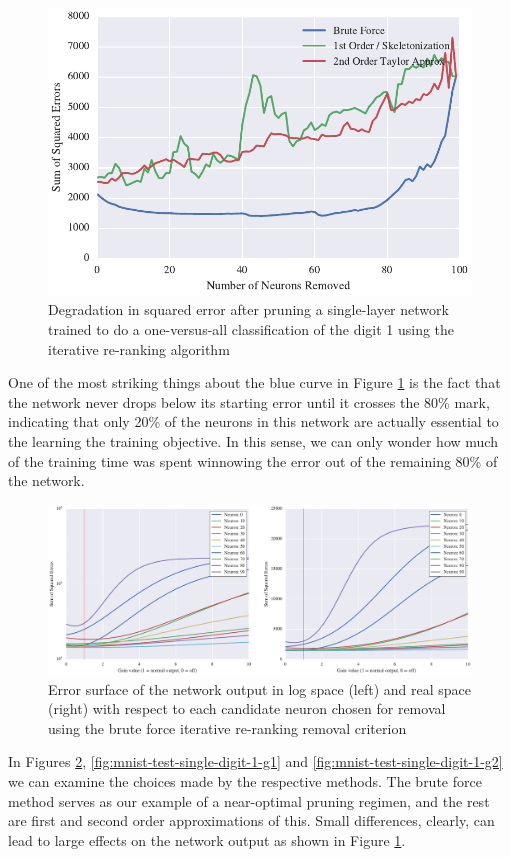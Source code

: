 \begin{figure}[!ht]
\centering
\includegraphics[width=0.5\linewidth]{mnist-test-single-digit-1.pdf}
\caption{Degradation in squared error after pruning a single-layer network trained to do a one-versus-all classification of the digit 1 using the iterative re-ranking algorithm}
\label{fig:mnist-test-single-digit-1}
\end{figure}

One of the most striking things about the blue curve in Figure \ref{fig:mnist-test-single-digit-1} is the fact that the network never drops below its starting error until it crosses the 80\% mark, indicating that only 20\% of the neurons in this network are actually essential to the learning the training objective. In this sense, we can only wonder how much of the training time was spent winnowing the error out of the remaining 80\% of the network. 

\begin{figure}[!ht]
\centering
\includegraphics[width=\linewidth]{mnist-test-single-digit-1-gt.pdf}
\caption{Error surface of the network output in log space (left) and real space (right) with respect to each candidate neuron chosen for removal using the brute force iterative re-ranking removal criterion}
\label{fig:mnist-test-single-digit-1-gt}
\end{figure}

In Figures \ref{fig:mnist-test-single-digit-1-gt}, \ref{fig:mnist-test-single-digit-1-g1} and \ref{fig:mnist-test-single-digit-1-g2} we can examine the choices made by the respective methods. The brute force method serves as our example of a near-optimal pruning regimen, and the rest are first and second order approximations of this. Small differences, clearly, can lead to large effects on the network output as shown in Figure \ref{fig:mnist-test-single-digit-1}.

